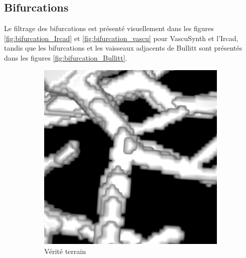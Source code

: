 \subsection{Bifurcations}

Le filtrage des bifurcations est présenté visuellement dans les figures \ref{fig:bifurcation_Ircad} et \ref{fig:bifurcation_vascu} pour VascuSynth et l'Ircad, tandis que les bifurcations et les vaisseaux adjacents de Bullitt sont présentés dans les figures \ref{fig:bifurcation_Bullitt}.

\begin{figure}[!ht]
  \captionsetup[subfigure]{justification=centering}
  \centering
      \begin{subfigure}[t]{0.30\textwidth}
        \includegraphics[clip = true, trim  = 0 50 0 80, width=\textwidth]{Images/Ircad_k_GT.png}
        \caption{Vérité terrain}
      \end{subfigure}
      \begin{subfigure}[t]{0.30\textwidth}

\end{subfigure}
\end{figure}

